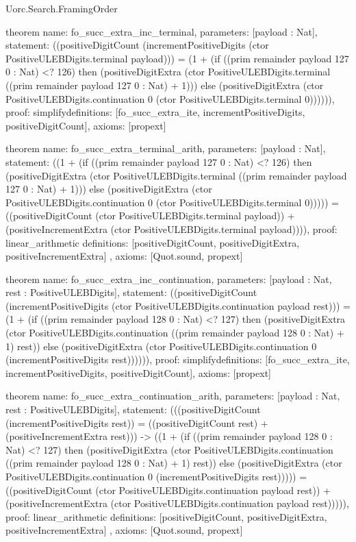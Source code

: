 \begin{lexlean}{Uorc.Search.FramingOrder}
\begin{semanticmodule}
theorem{
  name: fo_succ_extra_inc_terminal,
  parameters: [payload : Nat],
  statement: ((positiveDigitCount (incrementPositiveDigits (ctor PositiveULEBDigits.terminal payload))) = (1 + (if ((prim remainder payload 127 0 : Nat) <? 126) then (positiveDigitExtra (ctor PositiveULEBDigits.terminal ((prim remainder payload 127 0 : Nat) + 1))) else (positiveDigitExtra (ctor PositiveULEBDigits.continuation 0 (ctor PositiveULEBDigits.terminal 0)))))),
  proof: simplify{definitions: [fo_succ_extra_ite, incrementPositiveDigits, positiveDigitCount]},
  axioms: [propext]
}

theorem{
  name: fo_succ_extra_terminal_arith,
  parameters: [payload : Nat],
  statement: ((1 + (if ((prim remainder payload 127 0 : Nat) <? 126) then (positiveDigitExtra (ctor PositiveULEBDigits.terminal ((prim remainder payload 127 0 : Nat) + 1))) else (positiveDigitExtra (ctor PositiveULEBDigits.continuation 0 (ctor PositiveULEBDigits.terminal 0))))) = ((positiveDigitCount (ctor PositiveULEBDigits.terminal payload)) + (positiveIncrementExtra (ctor PositiveULEBDigits.terminal payload)))),
  proof: linear_arithmetic{
    definitions: [positiveDigitCount, positiveDigitExtra, positiveIncrementExtra]
  },
  axioms: [Quot.sound, propext]
}

theorem{
  name: fo_succ_extra_inc_continuation,
  parameters: [payload : Nat, rest : PositiveULEBDigits],
  statement: ((positiveDigitCount (incrementPositiveDigits (ctor PositiveULEBDigits.continuation payload rest))) = (1 + (if ((prim remainder payload 128 0 : Nat) <? 127) then (positiveDigitExtra (ctor PositiveULEBDigits.continuation ((prim remainder payload 128 0 : Nat) + 1) rest)) else (positiveDigitExtra (ctor PositiveULEBDigits.continuation 0 (incrementPositiveDigits rest)))))),
  proof: simplify{definitions: [fo_succ_extra_ite, incrementPositiveDigits, positiveDigitCount]},
  axioms: [propext]
}

theorem{
  name: fo_succ_extra_continuation_arith,
  parameters: [payload : Nat, rest : PositiveULEBDigits],
  statement: (((positiveDigitCount (incrementPositiveDigits rest)) = ((positiveDigitCount rest) + (positiveIncrementExtra rest))) -> ((1 + (if ((prim remainder payload 128 0 : Nat) <? 127) then (positiveDigitExtra (ctor PositiveULEBDigits.continuation ((prim remainder payload 128 0 : Nat) + 1) rest)) else (positiveDigitExtra (ctor PositiveULEBDigits.continuation 0 (incrementPositiveDigits rest))))) = ((positiveDigitCount (ctor PositiveULEBDigits.continuation payload rest)) + (positiveIncrementExtra (ctor PositiveULEBDigits.continuation payload rest))))),
  proof: linear_arithmetic{
    definitions: [positiveDigitCount, positiveDigitExtra, positiveIncrementExtra]
  },
  axioms: [Quot.sound, propext]
}


\end{semanticmodule}
\end{lexlean}
